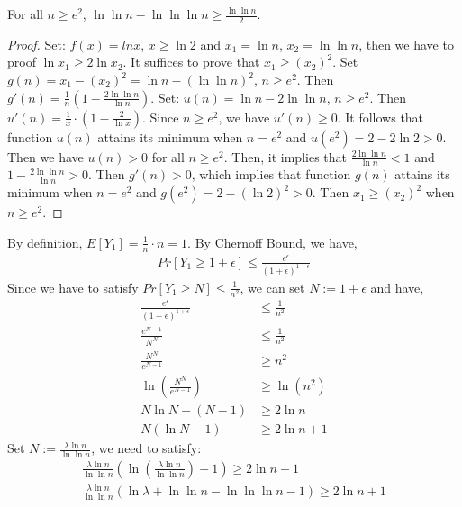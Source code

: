 \begin{claim}\label{1}
    For all $n\ge e^2$, $\ln \ln n -\ln \ln \ln n \ge \frac{\ln \ln n}{2}$.
\end{claim}
\begin{proof}
    Set: $f(x)=lnx$, $x\ge \ln 2$ and $x_1=\ln n$, $x_2=\ln\ln n$, then we have to proof $\ln x_1 \ge 2 \ln x_2$.
    It suffices to prove that $x_1 \ge (x_2)^2$.
    Set $g(n)=x_1-(x_2)^2=\ln n- (\ln\ln n)^2$, $n \ge e^2$. Then $g'(n)=\frac{1}{n}(1-\frac{2\ln \ln n}{\ln n})$.
    Set: $u(n)=\ln n - 2\ln \ln n$, $n \ge e^2$. Then $u'(n)=\frac{1}{x} \cdot (1-\frac{2}{\ln x})$.
    Since $n\ge e^2$, we have $u'(n)\ge 0$. It follows that function $u(n)$ attains its minimum when $n=e^2$ and $u(e^2)=2-2\ln 2>0$.
    Then we have $u(n)>0$ for all $n \ge e^2$. Then, it implies that $\frac{2\ln \ln n}{\ln n}<1$ and $1-\frac{2\ln \ln n}{\ln n}>0$.
    Then  $g'(n)> 0$, which implies that function $g(n)$ attains its minimum when $n=e^2$ and $g(e^2)=2-(\ln 2)^2>0$.
    Then $x_1 \ge (x_2)^2$ when $n\ge e^2$.

\end{proof}
\noindent By definition, $E[Y_1]=\frac{1}{n}\cdot n =1$.
By Chernoff Bound, we have,
\begin{align}
    \nonumber Pr[Y_1\ge 1+\epsilon] \le \frac{e^\epsilon}{(1+\epsilon)^{1+\epsilon}}
\end{align}
Since we have to satisfy $Pr[Y_1\ge N] \le \frac{1}{n^2}$, we can set $N:=1+\epsilon$ and have,
\begin{align}
    \nonumber \frac{e^\epsilon}{(1+\epsilon)^{1+\epsilon}}&\le \frac{1}{n^2}\\
    \nonumber \frac{e^{N-1}}{N^N}&\le \frac{1}{n^2}\\
    \nonumber \frac{N^N}{e^{N-1}}&\ge n^2\\
    \nonumber  \ln (\frac{N^N}{e^{N-1}})&\ge \ln (n^2)\\
    \nonumber N \ln N - (N-1) &\ge 2\ln n \\
    \nonumber N(\ln N -1) & \ge 2\ln n +1
\end{align}
Set $N:=\frac{\lambda \ln n}{\ln \ln n}$, we need to satisfy:
\begin{align}
    \nonumber \frac{\lambda \ln n}{\ln \ln n}(\ln (\frac{\lambda \ln n}{\ln \ln n})-1) \ge 2\ln n +1\\
    \nonumber \frac{\lambda \ln n}{\ln \ln n}(\ln \lambda +\ln\ln n -\ln \ln \ln n -1) \ge 2\ln n +1
\end{align}

